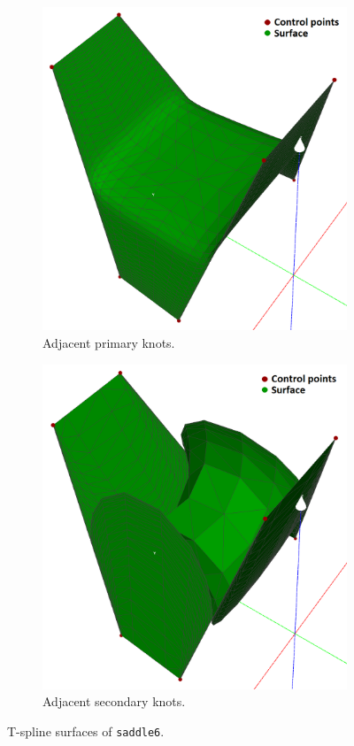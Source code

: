 \documentclass{article}
\begin{document}
\begin{figure}[H]
\begin{subfigure}[b]{0.32\textwidth}
\includegraphics[width=\textwidth]{saddle6b}
\caption{Adjacent primary knots.}
\label{saddle6b}
\end{subfigure}
\begin{subfigure}[b]{0.32\textwidth}
\includegraphics[width=\textwidth]{saddle6c}
\caption{Adjacent secondary knots.}
\label{saddle6c}
\end{subfigure}
\caption{T-spline surfaces of \texttt{saddle6}.}
\label{saddle6}
\end{figure}
\end{document}
